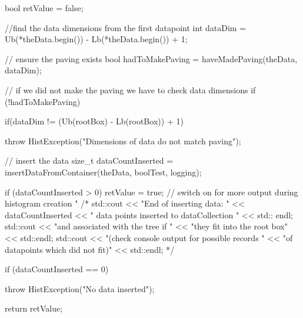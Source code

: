\begin{DoxyCode}
{

    bool retValue = false;

    //find the data dimensions from the first datapoint
    int dataDim = Ub(*theData.begin()) - Lb(*theData.begin()) + 1;

    // ensure the paving exists
    bool hadToMakePaving = haveMadePaving(theData, dataDim);

    // if we did not make the paving we have to check data dimensions
    if (!hadToMakePaving) {
        if(dataDim != (Ub(rootBox) - Lb(rootBox)) + 1) {

            throw HistException("Dimensions of data do not match paving");
        }
    }

    // insert the data
    size_t dataCountInserted
            = insertDataFromContainer(theData, boolTest, logging);

    if (dataCountInserted > 0) {
        retValue = true;
        // switch on for more output during histogram creation "
        /*
        std::cout << "End of inserting data: " << dataCountInserted
            << " data points inserted to dataCollection "
            << std:: endl;
        std::cout << "and associated with the tree if "
            << "they fit into the root box" << std::endl;
        std::cout << "(check console output for possible records "
            << "of datapoints which did not fit)" << std::endl;
        */
        }

    if (dataCountInserted == 0) {
        throw HistException("No data inserted");

    }

    return retValue;
}
\end{DoxyCode}

